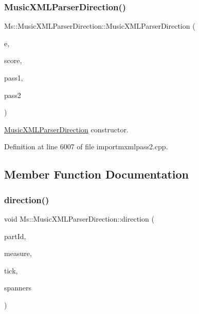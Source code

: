 \subsubsection{\texorpdfstring{Music\+X\+M\+L\+Parser\+Direction()}{MusicXMLParserDirection()}}
{\footnotesize\ttfamily Ms\+::\+Music\+X\+M\+L\+Parser\+Direction\+::\+Music\+X\+M\+L\+Parser\+Direction (\begin{DoxyParamCaption}\item[{Q\+Xml\+Stream\+Reader \&}]{e,  }\item[{\hyperlink{class_ms_1_1_score}{Score} $\ast$}]{score,  }\item[{const \hyperlink{class_ms_1_1_music_x_m_l_parser_pass1}{Music\+X\+M\+L\+Parser\+Pass1} \&}]{pass1,  }\item[{\hyperlink{class_ms_1_1_music_x_m_l_parser_pass2}{Music\+X\+M\+L\+Parser\+Pass2} \&}]{pass2 }\end{DoxyParamCaption})}

\hyperlink{class_ms_1_1_music_x_m_l_parser_direction}{Music\+X\+M\+L\+Parser\+Direction} constructor. 

Definition at line 6007 of file importmxmlpass2.\+cpp.



\subsection{Member Function Documentation}
\mbox{\label{class_ms_1_1_music_x_m_l_parser_direction_a288e85af15748149c954237d3b3b8688}} 
\subsubsection{\texorpdfstring{direction()}{direction()}}
{\footnotesize\ttfamily void Ms\+::\+Music\+X\+M\+L\+Parser\+Direction\+::direction (\begin{DoxyParamCaption}\item[{const Q\+String \&}]{part\+Id,  }\item[{\hyperlink{class_ms_1_1_measure}{Measure} $\ast$}]{measure,  }\item[{const int}]{tick,  }\item[{Music\+Xml\+Spanner\+Map \&}]{spanners }\end{DoxyParamCaption})}

